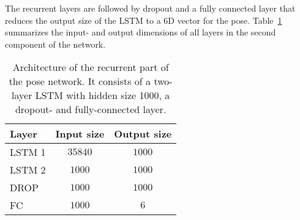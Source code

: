 			The recurrent layers are followed by dropout and a fully connected layer that reduces the output size of the LSTM to a 6D vector for the pose.
			Table~\ref{tbl:lstm_and_fc_after_flownet} summarizes the input- and output dimensions of all layers in the second component of the network.
			\begin{table}[tb]
				\small
				\begin{center}
					\begin{tabular}{lcc}
						\toprule
						Layer 		& Input size 					& Output size			\\
						\midrule
						LSTM 1 		& $35840$						& $1000$  				\\
						LSTM 2 		& $1000$						& $1000$ 				\\
						DROP		& $1000$						& $1000$				\\
						FC 			& $1000$						& $6$					\\
						\bottomrule
					\end{tabular}
				\end{center}
				\caption[Architecture of the recurrent part of the pose network]
						{Architecture of the recurrent part of the pose network.
						 It consists of a two-layer LSTM with hidden size 1000, a dropout- and fully-connected layer.
						 }
				\label{tbl:lstm_and_fc_after_flownet}
			\end{table}
		
